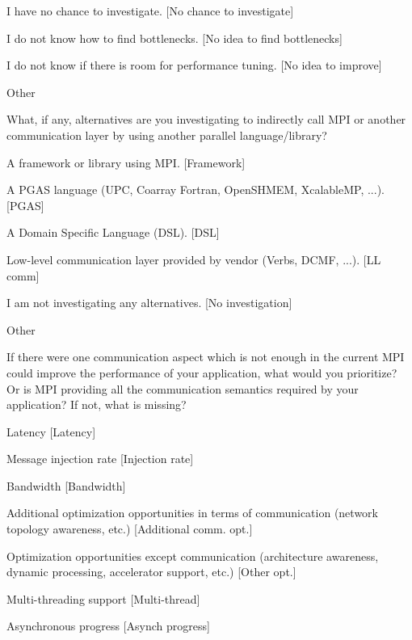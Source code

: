 \documentclass[preprint,5p,times]{elsarticle}
\begin{document}
{\begin{description}
\begin{inparaenum}
    \item I have no chance to investigate.
      [No chance to investigate]
    \item I do not know how to find bottlenecks.
      [No idea to find bottlenecks]
    \item I do not know if there is room for performance tuning.
      [No idea to improve]
    \item Other
    \end{inparaenum}
  \item[Q24*:] What, if any, alternatives are you investigating to
    indirectly call MPI or another communication layer by using another
    parallel language/library?
    \begin{inparaenum}[{\bf C}1)]
    \item A framework or library using MPI. [Framework]
    \item A PGAS language (UPC, Coarray Fortran, OpenSHMEM, XcalableMP,
      ...). [PGAS]
    \item A Domain Specific Language (DSL). [DSL]
    \item Low-level communication layer provided by vendor (Verbs, DCMF,
      ...). [LL comm]
    \item I am not investigating any alternatives. [No investigation]
    \item Other
    \end{inparaenum}
  \item[Q25:] If there were one communication aspect which is not enough
    in the current MPI could improve the performance of your application,
    what would you prioritize? Or is MPI providing all the communication
    semantics required by your application? If not, what is missing?
    \begin{inparaenum}[{\bf C}1)]
    \item Latency [Latency]
    \item Message injection rate [Injection rate]
    \item Bandwidth [Bandwidth]
    \item Additional optimization opportunities in terms of communication
      (network topology awareness, etc.) [Additional comm. opt.]
    \item Optimization opportunities except communication (architecture
      awareness, dynamic processing, accelerator support, etc.) [Other opt.]
    \item Multi-threading support [Multi-thread]
    \item Asynchronous progress [Asynch progress]

\end{inparaenum}
\end{description}}
\end{document}
